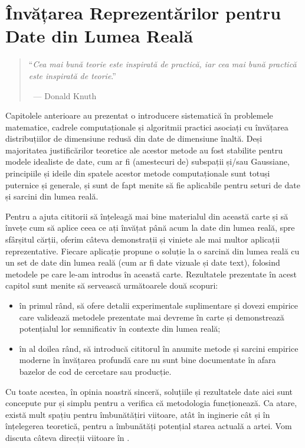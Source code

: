 \documentclass[../../book-main_ro.tex]{subfiles}
\begin{document}
\chapter{Învățarea Reprezentărilor pentru Date din Lumea Reală}
\label{ch:applications}

\begin{quote}
\hfill    ``{\em Cea mai bună teorie este inspirată de practică, iar cea mai bună practică este inspirată de teorie}.''

$~$ \hfill --- Donald Knuth   
\end{quote}
\vspace{5mm}

Capitolele anterioare au prezentat o introducere sistematică în problemele matematice, cadrele computaționale și algoritmii practici asociați cu învățarea distribuțiilor de dimensiune redusă din date de dimensiune înaltă. Deși majoritatea justificărilor teoretice ale acestor metode au fost stabilite pentru modele idealiste de date, cum ar fi (amestecuri de) subspații și/sau Gaussiane, principiile și ideile din spatele acestor metode computaționale sunt totuși puternice și generale, și sunt de fapt menite să fie aplicabile pentru seturi de date și sarcini din lumea reală.

Pentru a ajuta cititorii să înțeleagă mai bine materialul din această carte și să învețe cum să aplice ceea ce ați învățat până acum la date din lumea reală, spre sfârșitul cărții, oferim câteva demonstrații și viniete ale mai multor aplicații reprezentative. Fiecare aplicație propune o soluție la o sarcină din lumea reală cu un set de date din lumea reală (cum ar fi date vizuale și date text), folosind metodele pe care le-am introdus în această carte. Rezultatele prezentate în acest capitol sunt menite să servească următoarele două scopuri:
\begin{itemize}
    \item în primul rând, să ofere detalii experimentale suplimentare și dovezi empirice care validează metodele prezentate mai devreme în carte și demonstrează potențialul lor semnificativ în contexte din lumea reală;
    \item în al doilea rând, să introducă cititorul în anumite metode și sarcini empirice moderne în învățarea profundă care nu sunt bine documentate în afara bazelor de cod de cercetare sau producție.
\end{itemize}
Cu toate acestea, în opinia noastră sinceră, soluțiile și rezultatele date aici sunt concepute pur și simplu pentru a verifica că metodologia funcționează. Ca atare, există mult spațiu pentru îmbunătățiri viitoare, atât în inginerie cât și în înțelegerea teoretică, pentru a îmbunătăți potențial starea actuală a artei. Vom discuta câteva direcții viitoare în .
\end{document}
